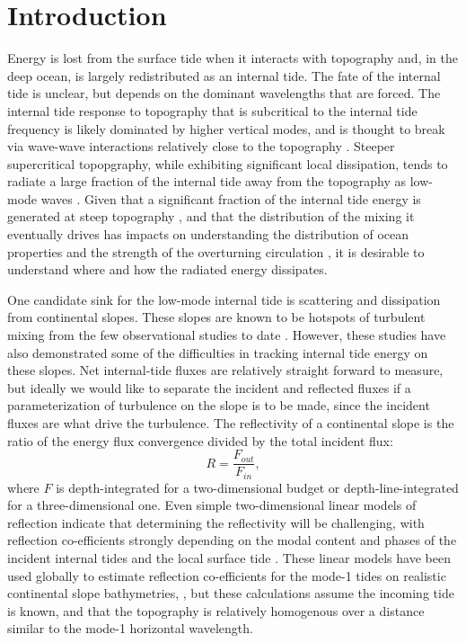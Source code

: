 \documentclass[12pt]{article}
\begin{document}
\section{Introduction}


Energy is lost from the surface tide when it interacts with topography and, in the deep ocean, is largely redistributed as an internal tide.  The fate of the internal tide is unclear, but depends on the dominant wavelengths that are forced.  The internal tide response to topography that is subcritical to the internal tide frequency is likely dominated by higher vertical modes, and is thought to break via wave-wave interactions relatively close to the topography \citep[i.e.][]{polzin09,stlaurentgarrett02}.  Steeper supercritical topopgraphy, while exhibiting significant local dissipation, tends to radiate a large fraction of the internal tide away from the topography as low-mode waves \citep[i.e. at Hawaii;][]{klymaketal06b,carteretal08}.  Given that a significant fraction of the internal tide energy is generated at steep topography \citep{leggklymak08}, and that the distribution of the mixing it eventually drives has impacts on understanding the distribution of ocean properties and the strength of the overturning circulation \citep[i.e.][]{meletetal13}, it is desirable to understand where and how the radiated energy dissipates.

One candidate sink for the low-mode internal tide is scattering and dissipation from continental slopes.  These slopes are known to be hotspots of turbulent mixing from the few observational studies to date \citep{nashetal07,klymaketal11a,martinietal13}.  However, these studies have also demonstrated some of the difficulties in tracking internal tide energy on these slopes.  Net internal-tide fluxes are relatively straight forward to measure, but ideally we would like to separate the incident and reflected fluxes if a parameterization of turbulence on the slope is to be made, since the incident fluxes are what drive the turbulence.  The reflectivity of a continental slope is the ratio of the energy flux convergence divided by the total incident flux: 
\begin{equation}
 R = \frac{F_{out}}{F_{in}},
\end{equation}
where $F$ is depth-integrated for a two-dimensional budget or depth-line-integrated for a three-dimensional one.  Even simple two-dimensional linear models of reflection indicate that determining the reflectivity will be challenging, with reflection co-efficients strongly depending on the modal content and phases of the incident internal tides \citep{klymaketal11a} and the local surface tide \citep{kellynash10}.  These linear models have been used globally to estimate reflection co-efficients for the mode-1 tides on realistic continental slope bathymetries, \citep{kellyetal13a,kellyetal13b}, but these calculations assume the incoming tide is known, and that the topography is relatively homogenous over a distance similar to the mode-1 horizontal wavelength.  
\end{document}
